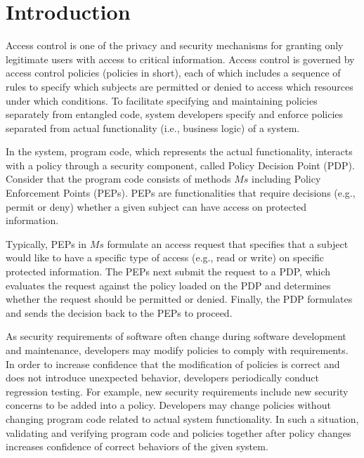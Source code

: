 \section{Introduction} \label{sec:introduction}
 
Access control is one of the privacy and security mechanisms for granting only legitimate users with access to critical information. 
Access control is governed by access control policies (policies in short), each of which includes a sequence of rules to specify 
which subjects are permitted or denied to access which resources under which conditions. To facilitate specifying and maintaining policies separately from entangled code, 
system developers specify and enforce policies separated from actual functionality (i.e., business logic) of a system.

In the system, program code, which represents the actual functionality,
interacts with a policy through a security component, called Policy Decision Point (PDP).
Consider that the program code consists of methods $Ms$ including Policy Enforcement Points (PEPs).
PEPs are functionalities that require decisions (e.g., permit or deny) whether a given subject can have access on protected information.

Typically, PEPs in $Ms$ formulate an access request that specifies that a subject would like to have a specific type of access (e.g., read or write) on specific protected information. 
The PEPs next submit the request to a PDP, which evaluates the request against the policy loaded on the PDP and determines whether the request should be permitted or denied. Finally, 
the PDP formulates and sends the
decision back to the PEPs to proceed.

As security requirements of software often change during software development and maintenance,
developers may modify policies to comply with requirements. In order to increase confidence that the modification of policies is correct and
does not introduce unexpected behavior, developers periodically conduct regression testing.
For example, new security requirements include new security concerns to be added into a policy.
Developers may change policies without changing program code related to actual system functionality.
In such a situation, validating and verifying program code and policies together after policy changes
increases confidence of correct behaviors of the given system.


